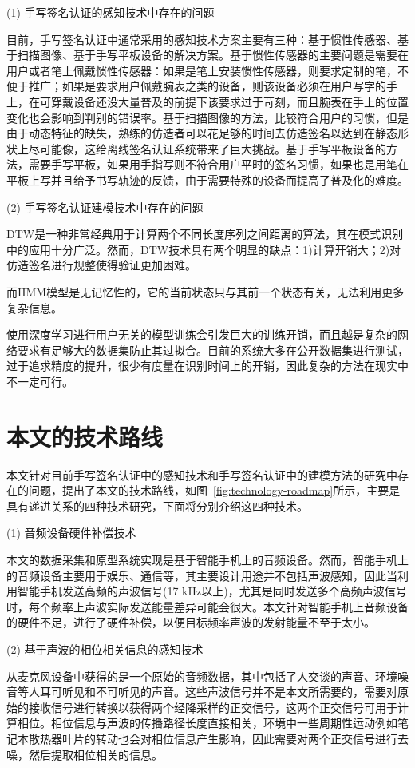(1) 手写签名认证的感知技术中存在的问题

目前，手写签名认证中通常采用的感知技术方案主要有三种：基于惯性传感器、基于扫描图像、基于手写平板设备的解决方案。基于惯性传感器的主要问题是需要在用户或者笔上佩戴惯性传感器：如果是笔上安装惯性传感器，则要求定制的笔，不便于推广；如果是要求用户佩戴腕表之类的设备，则该设备必须在用户写字的手上，在可穿戴设备还没大量普及的前提下该要求过于苛刻，而且腕表在手上的位置变化也会影响到判别的错误率。基于扫描图像的方法，比较符合用户的习惯，但是由于动态特征的缺失，熟练的仿造者可以花足够的时间去仿造签名以达到在静态形状上尽可能像，这给离线签名认证系统带来了巨大挑战。基于手写平板设备的方法，需要手写平板，如果用手指写则不符合用户平时的签名习惯，如果也是用笔在平板上写并且给予书写轨迹的反馈，由于需要特殊的设备而提高了普及化的难度。

(2) 手写签名认证建模技术中存在的问题

DTW是一种非常经典用于计算两个不同长度序列之间距离的算法，其在模式识别中的应用十分广泛。然而，DTW技术具有两个明显的缺点：1)计算开销大；2)对仿造签名进行规整使得验证更加困难。

而HMM模型是无记忆性的，它的当前状态只与其前一个状态有关，无法利用更多复杂信息。

使用深度学习进行用户无关的模型训练会引发巨大的训练开销，而且越是复杂的网络要求有足够大的数据集防止其过拟合。目前的系统大多在公开数据集进行测试，过于追求精度的提升，很少有度量在识别时间上的开销，因此复杂的方法在现实中不一定可行。

\section{本文的技术路线}

本文针对目前手写签名认证中的感知技术和手写签名认证中的建模方法的研究中存在的问题，提出了本文的技术路线，如图~\ref{fig:technology-roadmap}所示，主要是具有递进关系的四种技术研究，下面将分别介绍这四种技术。

(1) 音频设备硬件补偿技术

本文的数据采集和原型系统实现是基于智能手机上的音频设备。然而，智能手机上的音频设备主要用于娱乐、通信等，其主要设计用途并不包括声波感知，因此当利用智能手机发送高频的声波信号(17 kHz以上)，尤其是同时发送多个高频声波信号时，每个频率上声波实际发送能量差异可能会很大。本文针对智能手机上音频设备的硬件不足，进行了硬件补偿，以便目标频率声波的发射能量不至于太小。

(2) 基于声波的相位相关信息的感知技术

从麦克风设备中获得的是一个原始的音频数据，其中包括了人交谈的声音、环境噪音等人耳可听见和不可听见的声音。这些声波信号并不是本文所需要的，需要对原始的接收信号进行转换以获得两个经降采样的正交信号，这两个正交信号可用于计算相位。相位信息与声波的传播路径长度直接相关，环境中一些周期性运动例如笔记本散热器叶片的转动也会对相位信息产生影响，因此需要对两个正交信号进行去噪，然后提取相位相关的信息。

